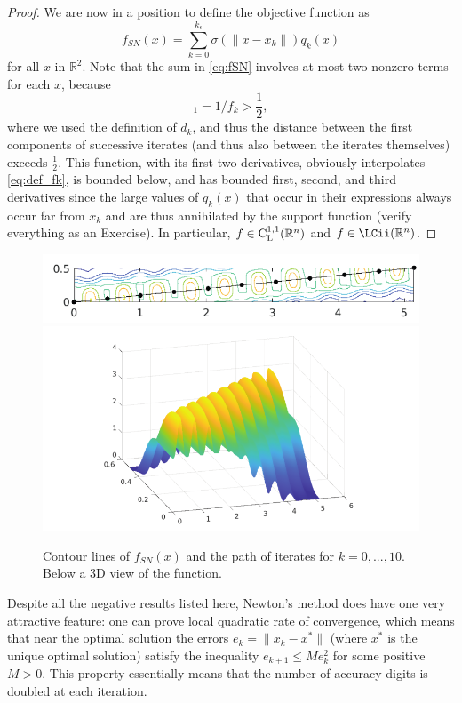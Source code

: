 \documentclass[10pt,a4paper]{article}
\begin{document}
\begin{proof}
	We are now in a position to define the objective function as
	\begin{equation*}\label{eq:fSN}
		f_{SN}(x) = \sum_{k=0}^{k_\epsilon} \sigma(\|x - x_k\|) q_k(x)
	\end{equation*}
	for all $x$ in $\mathbb{R}^2$. Note that the sum in \eqref{eq:fSN} involves at most two nonzero terms for each $x$, because
	\begin{equation*}
		[d_k]_1 = 1/f_k > \frac{1}{2},
	\end{equation*}
	where we used the definition of $d_k$, and thus the distance between the first components of successive iterates (and thus also between the iterates themselves) exceeds $\frac{1}{2}$. This function, with its first two derivatives, obviously interpolates \eqref{eq:def_fk}, is bounded below, and has bounded first, second, and third derivatives since the large values of $q_k(x)$ that occur in their expressions always occur far from $x_k$ and are thus annihilated by the support function (verify everything as an Exercise). In particular, $f\in\mathord{\mathrm{C^{1,1}_{L}}}(\mathbb{R}^n)$ and $f\in \LCii(\Rn)$.
\end{proof}

\begin{figure}
	\centering
	\includegraphics[width=0.5\linewidth]{slow_newton_contour}
	\includegraphics[width=0.5\linewidth]{slow_newton_3d}
	\caption{Contour lines of $f_{SN}(x)$ and the path of iterates for $k = 0, . . . , 10$. Below a 3D view of the function.}
\end{figure}
\noindent Despite all the negative results listed here, Newton's method does have one very attractive feature: one can prove local quadratic rate of convergence, which means that near the optimal solution the errors $e_k = \|x_k - x^*\|$ (where $x^*$ is the unique optimal solution) satisfy the inequality $e_{k+1} \leq M e_k^2$ for some positive $M > 0$. This property essentially means that the number of accuracy digits is doubled at each iteration.
\end{document}
